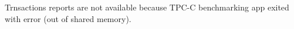 \documentclass[../../main.tex]{subfiles}
\begin{document}
    Trnsactions reports are not available because TPC-C benchmarking app exited with error (out of shared memory).
\end{document}
